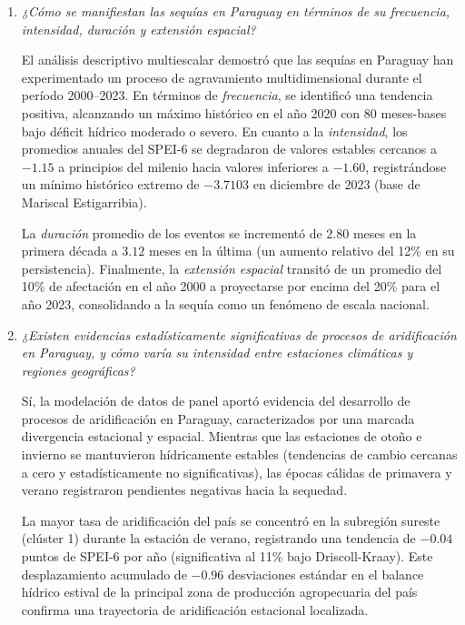 \begin{enumerate}
    \item \textit{¿Cómo se manifiestan las sequías en Paraguay en términos de su frecuencia, intensidad, duración y extensión espacial?}
    
    El análisis descriptivo multiescalar demostró que las sequías en Paraguay han experimentado un proceso de agravamiento multidimensional durante el período 2000--2023. En términos de \textit{frecuencia}, se identificó una tendencia positiva, alcanzando un máximo histórico en el año 2020 con 80 meses-bases bajo déficit hídrico moderado o severo. En cuanto a la \textit{intensidad}, los promedios anuales del SPEI-6 se degradaron de valores estables cercanos a $-1.15$ a principios del milenio hacia valores inferiores a $-1.60$, registrándose un mínimo histórico extremo de $-3.7103$ en diciembre de 2023 (base de Mariscal Estigarribia). 
    
    La \textit{duración} promedio de los eventos se incrementó de $2.80$ meses en la primera década a $3.12$ meses en la última (un aumento relativo del 12\% en su persistencia). Finalmente, la \textit{extensión espacial} transitó de un promedio del 10\% de afectación en el año 2000 a proyectarse por encima del 20\% para el año 2023, consolidando a la sequía como un fenómeno de escala nacional.

    \item \textit{¿Existen evidencias estadísticamente significativas de procesos de aridificación en Paraguay, y cómo varía su intensidad entre estaciones climáticas y regiones geográficas?}
    
    Sí, la modelación de datos de panel aportó evidencia del desarrollo de procesos de aridificación en Paraguay, caracterizados por una marcada divergencia estacional y espacial. Mientras que las estaciones de otoño e invierno se mantuvieron hídricamente estables (tendencias de cambio cercanas a cero y estadísticamente no significativas), las épocas cálidas de primavera y verano registraron pendientes negativas hacia la sequedad. 
    
    La mayor tasa de aridificación del país se concentró en la subregión sureste (clúster 1) durante la estación de verano, registrando una tendencia de $-0.04$ puntos de SPEI-6 por año (significativa al 11\% bajo Driscoll-Kraay). Este desplazamiento acumulado de $-0.96$ desviaciones estándar en el balance hídrico estival de la principal zona de producción agropecuaria del país confirma una trayectoria de aridificación estacional localizada.


\end{enumerate}
